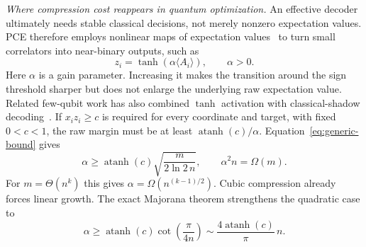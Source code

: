 \documentclass[10pt,aps,pra,twocolumn,superscriptaddress,nofootinbib,longbibliography]{revtex4-2}
\newcommand{\atanh}{\operatorname{atanh}}
\begin{document}
\emph{Where compression cost reappears in quantum optimization.}
An effective decoder ultimately needs stable classical decisions, not merely nonzero expectation values.  PCE therefore employs nonlinear maps of expectation values~\cite{Sciorilli2025PCE,Patti2022MBE} to turn small correlators into near-binary outputs, such as
\begin{equation}
    z_i=\tanh(\alpha\langle A_i\rangle),\qquad \alpha>0.
    \label{eq:decoder-tanh}
\end{equation}
Here $\alpha$ is a gain parameter.  Increasing it makes the transition around the sign threshold sharper but does not enlarge the underlying raw expectation value.
Related few-qubit work has also combined $\tanh$ activation with classical-shadow decoding~\cite{RaymondButsPistoia2025FewQubits}.  If $x_i z_i\ge c$ is required for every coordinate and target, with fixed $0<c<1$, the raw margin must be at least $\atanh(c)/\alpha$.  Equation~\eqref{eq:generic-bound} gives
\begin{equation}
    \alpha\ge \atanh(c)\sqrt{\frac{m}{2\ln2\,n}},
    \qquad \alpha^2n=\Omega(m).
    \label{eq:alpha-general}
\end{equation}
For $m=\Theta(n^k)$ this gives $\alpha=\Omega(n^{(k-1)/2})$.  Cubic compression already forces linear growth.  The exact Majorana theorem strengthens the quadratic case to
\begin{equation}
    \alpha\ge \atanh(c)\cot\!\left(\frac{\pi}{4n}\right)
    \sim \frac{4\atanh(c)}{\pi}\,n.
    \label{eq:alpha-majorana}
\end{equation}
\end{document}

